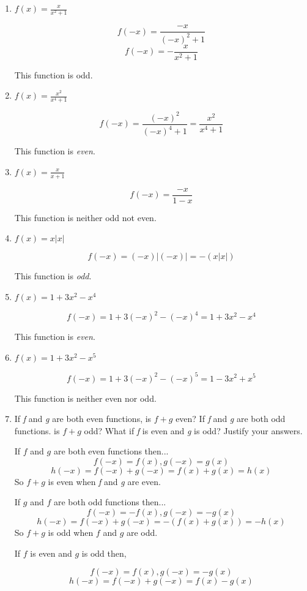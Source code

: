 \documentclass{article}
\begin{document}
\begin{enumerate}
		\item $f(x) = \frac{x}{x^2 + 1}$
		
			$$f(-x) = \frac{-x}{(-x)^2 + 1}$$
			$$f(-x) = - \frac{x}{x^2 + 1}$$
			
			This function is odd.

	\item $f(x) = \frac{x^2}{x^4 + 1}$

		$$f(-x) = \frac{(-x)^2}{(-x)^4 + 1} = \frac{x^2}{x^4 + 1}$$

		This function is \emph{even}.

	\item $f(x) = \frac{x}{x + 1}$

		$$f(-x) = \frac{-x}{1 - x}$$

		This function is neither odd not even.

	\item $f(x) = x | x |$

		$$f(-x) = (-x) | (-x) | =  - (x | x |)$$

		This function is \emph{odd}.

	\item $f(x) = 1 + 3x^2 - x^4$

		$$f( -x) = 1 + 3(-x)^2 - (-x)^4 = 1 + 3x^2 - x^4$$

		This function is \emph{even}.

	\item $f(x) = 1 + 3x^2- x^5$

		$$f( - x ) = 1 + 3(-x)^2 - (-x)^5 = 1 - 3x^2 + x^5$$

		This function is neither even nor odd.

	\item If \emph{f} and \emph{g} are both even functions, is $f + g$ even? If
		\emph{f} and \emph{g} are both odd functions. is $f + g$ odd? What if
		\emph{f} is even and \emph{g} is odd? Justify your answers.

		If $f$ and $g$ are both even functions then...
		$$ f(-x) = f(x), g(-x) = g(x)$$
		$$h(-x) = f(-x) + g(-x) = f(x) + g(x) = h(x)$$
		So $f + g$ is even when \emph{f} and \emph{g} are even.

		If $g$ and $f$ are both odd functions then...
		$$f(-x) = - f(x), g(-x) = -g(x)$$
		$$h(-x) = f(-x) + g(-x) = - (f(x) + g(x)) = - h(x)$$
		So $f + g$ is odd when $f$ and $g$ are odd.

		If $f$ is even and $g$ is odd then,
		
		$$ f(-x) = f(x), g(-x) = -g(x)$$
		$$h(-x) = f(-x) + g(-x) = f(x) - g(x)$$


\end{enumerate}
\end{document}
